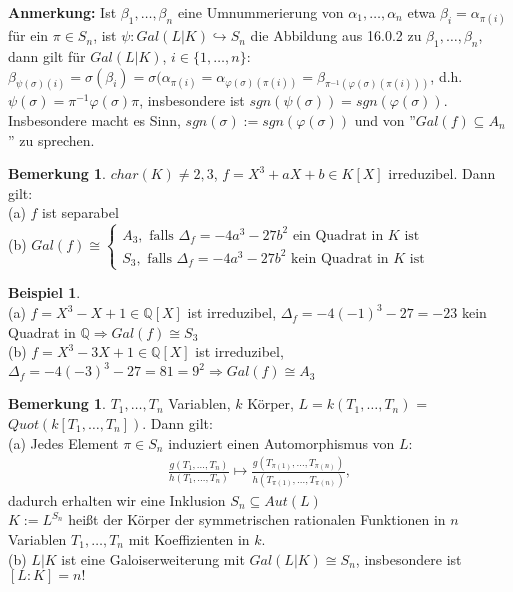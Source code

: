 \documentclass[10pt,a4paper,numbers=endperiod]{scrreprt}
\theoremstyle{definition}
\newtheorem{bem}[satz]{Bemerkung}
\newtheorem{bsp}[satz]{Beispiel}
\def\QQ{{\mathbb Q}}
\begin{document}
\textbf{Anmerkung:} Ist $\beta_1, \ldots, \beta_n$ eine Umnummerierung von $\alpha_1, \ldots, \alpha_n$ etwa $\beta_i = \alpha_{\pi(i)}$ für ein $\pi \in S_n$, ist $\psi: Gal(L|K) \hookrightarrow S_n$ die Abbildung aus 16.0.2 zu $\beta_1, \ldots, \beta_n$, dann gilt für $Gal(L|K)$, $i \in \{1, \ldots, n\}:$ $\beta_{\psi(\sigma)(i)} = \sigma(\beta_i) = \sigma(\alpha_{\pi(i)} = \alpha_{\varphi(\sigma)(\pi(i))} = \beta_{\pi^{-1}(\varphi(\sigma)(\pi(i)))}$, d.h. $\psi(\sigma) = \pi^{-1} \varphi(\sigma) \pi$, insbesondere ist $sgn(\psi(\sigma)) = sgn(\varphi(\sigma))$.\\
Insbesondere macht es Sinn, $sgn(\sigma) := sgn(\varphi(\sigma))$ und von ''$Gal(f) \subseteq A_n$'' zu sprechen.

\begin{bem}
	$char(K) \neq 2,3$, $f = X^3 + aX + b \in K[X]$ irreduzibel. Dann gilt:\\
	(a) $f$ ist separabel\\
	(b) $Gal(f) \cong \begin{cases}
	A_3, \text{ falls } \varDelta_f = -4a^3 - 27b^2 \text{ ein Quadrat in $K$ ist}\\
	S_3, \text{ falls } \varDelta_f = -4a^3 - 27b^2 \text{ kein Quadrat in $K$ ist}
	\end{cases}$
\end{bem}

\begin{bsp}
	$ $\\
	(a) $f = X^3 - X +1 \in \QQ[X]$ ist irreduzibel, $\varDelta_f = -4(-1)^3 - 27 = -23$ kein Quadrat in $\QQ \Rightarrow Gal(f) \cong S_3$\\
	(b) $f = X^3 - 3X +1 \in \QQ[X]$ ist irreduzibel, $\varDelta_f = -4(-3)^3 - 27 =  81 = 9^2  \Rightarrow Gal(f) \cong A_3$
\end{bsp}

\begin{bem}
	$T_1, \ldots, T_n$ Variablen, $k$ Körper, $L = k(T_1, \ldots, T_n)$ = $Quot(k[T_1, \ldots, T_n])$. Dann gilt:\\
	(a) Jedes Element $\pi \in S_n$ induziert einen Automorphismus von $L$:
	\begin{align*}
		\frac{g(T_1, \ldots, T_n)}{h(T_1, \ldots, T_n)} \longmapsto  \frac{g(T_{\pi(1)}, \ldots, T_{\pi(n)})}{h(T_{\pi(1)}, \ldots, T_{\pi(n)})},
	\end{align*}
	dadurch erhalten wir eine Inklusion $S_n \subseteq Aut(L)$\\
	$K := L^{S_n}$ heißt der Körper der symmetrischen rationalen Funktionen in $n$ Variablen $T_1, \ldots, T_n$ mit Koeffizienten in $k$.\\
	(b) $L|K$ ist eine Galoiserweiterung mit $Gal(L|K) \cong S_n$, insbesondere ist $[L:K] = n!$ 
\end{bem}
\end{document}

